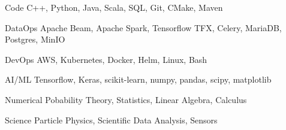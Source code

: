 

\begin{cvskills}

\cvskill
    {Code} %
    {C++, Python, Java, Scala, SQL, Git, CMake, Maven} %


\cvskill
    {DataOps} %
    {Apache Beam, Apache Spark, Tensorflow TFX, Celery, MariaDB, Postgres, MinIO} %

\cvskill
    {DevOps} %
    {AWS, Kubernetes, Docker, Helm, Linux, Bash} %

\cvskill
    {AI/ML} %
    {Tensorflow, Keras, scikit-learn, numpy, pandas, scipy, matplotlib} %


\cvskill

\cvskill
    {Numerical} %
    {Pobability Theory, Statistics, Linear Algebra, Calculus} %

\cvskill
    {Science} %
    {Particle Physics, Scientific Data Analysis, Sensors} %




\end{cvskills}
